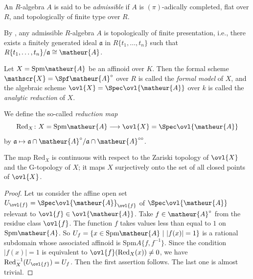 \begin{appdfn}\label{dfn-admissiblealg}
An $R$-algebra $A$ is said to be {\it admissible} if $A$ is 
$(\pi)$-adically completed, flat over $R$, and topologically 
of finite type over $R$.
\end{appdfn}

\begin{apprem}
By \cite[1.1\ (c)]{farg1rs}, any admissible $R$-algebra $A$ is 
topologically of finite presentation, i.e., there exists a finitely
generated ideal $\mathfrak{a}$ in $R\{t_1,\ldots,t_n\}$ such that
$R\{t_1,\ldots,t_n\}/\mathfrak{a}\cong\matheur{A}$.
\end{apprem}

\begin{appdfn}
Let $X=\mathrm{Spm}\matheur{A}$ be an affinoid over $K$.
Then the formal scheme $\mathscr{X}=\Spf\matheur{A}^{\circ}$ over $R$ is called
the {\it formal model} of $X$, and the algebraic scheme 
$\ovl{X}=\Spec\ovl{\matheur{A}}$ over $k$ is called the {\it analytic
reduction} of $X$.
\end{appdfn}

We define the so-called {\it reduction map}
$$
\mathrm{Red}_X\colon
X=\mathrm{Spm}\matheur{A}\longrightarrow\ovl{X}=\Spec\ovl{\matheur{A}}
$$
by $\mathfrak{a}\mapsto\mathfrak{a}\cap\matheur{A}^{\circ}/\mathfrak{a}\cap
\matheur{A}^{\circ\circ}$.

\begin{apppro}
The map $\mathrm{Red}_X$ is continuous with respect to the 
Zariski topology of $\ovl{X}$ and the G-topology of $X$; 
it maps $X$ surjectively onto the set of all
closed points of $\ovl{X}$.
\end{apppro}

\begin{proof}
Let us consider the affine open set 
$U_{\ovl{f}}=\Spec\ovl{\matheur{A}}_{\ovl{f}}$ of $\Spec\ovl{\matheur{A}}$
relevant to $\ovl{f}\in\ovl{\matheur{A}}$.
Take $f\in\matheur{A}^{\circ}$ from the residue class $\ovl{f}$.
The function $f$ takes values less than equal to $1$ on 
$\mathrm{Spm}\matheur{A}$.
So $U_f=\{x\in\mathrm{Spm}\matheur{A}\ |\ |f(x)|=1\}$ is a rational
subdomain whose associated affinoid is $\mathrm{Spm}A\{f,f^{-1}\}$.
Since the condition $|f(x)|=1$ is equivalent to 
$\ovl{f}(\mathrm{Red}_X(x))\neq 0$, we have 
$\mathrm{Red}_X^{-1}(U_{\ovl{f}})=U_f$.
Then the first assertion follows.
The last one is almost trivial.
\end{proof}

